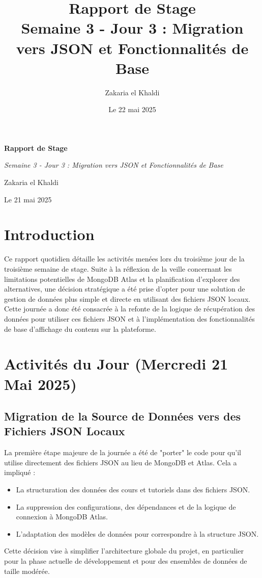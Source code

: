\documentclass[12pt, a4paper]{article}
\title{\Huge\bfseries\color{primary} Rapport de Stage \\ 
      \Large Semaine 3 - Jour 3 : Migration vers JSON et Fonctionnalités de Base} %
\author{\Large Zakaria el Khaldi}
\date{\large Le 22 mai 2025} %
\begin{document}
\begin{titlepage}
  \centering
  {\Huge\bfseries\color{primary} Rapport de Stage \par}
  \vspace{1cm}
  {\Large\itshape Semaine 3 - Jour 3 : Migration vers JSON et Fonctionnalités de Base\par} %
  \vspace{2cm}
  
  \vspace{2cm}
  {\Large Zakaria el Khaldi\par}
  \vfill
  {\large Le 21 mai 2025\par} %
\end{titlepage}

\tableofcontents
\thispagestyle{empty}
\newpage

\section{Introduction}
\thispagestyle{fancy}
Ce rapport quotidien détaille les activités menées lors du troisième jour de la troisième semaine de stage. Suite à la réflexion de la veille concernant les limitations potentielles de MongoDB Atlas et la planification d'explorer des alternatives, une décision stratégique a été prise d'opter pour une solution de gestion de données plus simple et directe en utilisant des fichiers JSON locaux. Cette journée a donc été consacrée à la refonte de la logique de récupération des données pour utiliser ces fichiers JSON et à l'implémentation des fonctionnalités de base d'affichage du contenu sur la plateforme.

\section{Activités du Jour (Mercredi 21 Mai 2025)} %

\subsection{Migration de la Source de Données vers des Fichiers JSON Locaux}
La première étape majeure de la journée a été de "porter" le code pour qu'il utilise directement des fichiers JSON au lieu de MongoDB et Atlas. Cela a impliqué :
\begin{itemize}
    \item La structuration des données des cours et tutoriels dans des fichiers JSON.
    \item La suppression des configurations, des dépendances et de la logique de connexion à MongoDB Atlas.
    \item L'adaptation des modèles de données pour correspondre à la structure JSON.
\end{itemize}
Cette décision vise à simplifier l'architecture globale du projet, en particulier pour la phase actuelle de développement et pour des ensembles de données de taille modérée.
\end{document}
